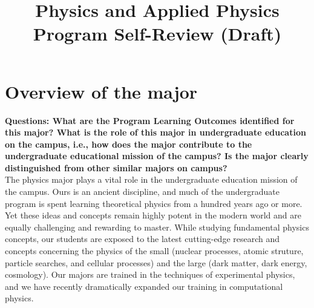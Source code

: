 \documentclass[12pt]{article}
\begin{document}


\title{Physics and Applied Physics \\ Program Self-Review (Draft)}

\maketitle

\section{Overview of the major}

{\bf Questions: What are the Program Learning Outcomes identified for this major? What is the role of this major in undergraduate education on the campus, i.e., how does the major contribute to the undergraduate educational mission of the campus? Is the major clearly distinguished from other similar majors on campus?}\\[3pt]


\noindent
The physics major plays a vital role in the undergraduate education
mission of the campus.  Ours is an ancient discipline, and much of the
undergraduate program is spent learning theoretical physics from a
hundred years ago or more.  Yet these ideas and concepts remain highly
potent in the modern world and are equally challenging and rewarding
to master.  While studying fundamental physics concepts, our students
are exposed to the latest cutting-edge research and concepts
concerning the physics of the small (nuclear processes, atomic
struture, particle searches, and cellular processes) and the large
(dark matter, dark energy, cosmology).  Our majors are trained in the
techniques of experimental physics, and we have recently dramatically
expanded our training in computational physics.
\end{document}
